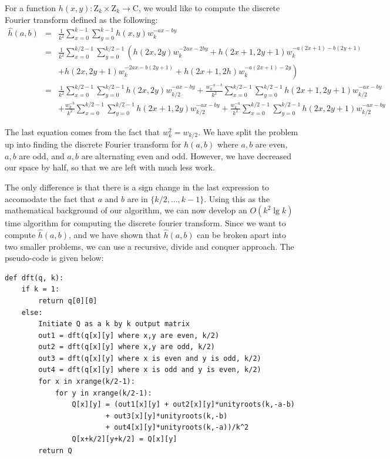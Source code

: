 \documentclass[psamsfonts]{amsart}
\newenvironment{sol}{{\bfseries Solution}}{\qedsymbol}
\theoremstyle{definition}
\theoremstyle{remark}
\numberwithin{equation}{section}
\begin{document}
\begin{sol}
For a function $h(x,y): \mathrm{Z}_{k} \times \mathrm{Z}_{k} \to \mathrm{C}$, we would like to compute the discrete Fourier transform defined as the following:
\begin{eqnarray}
\widehat{h}(a,b) &=& \frac{1}{k^2} \sum_{x=0}^{k-1} \sum_{y=0}^{k-1} h(x,y) w_k^{-ax-by} \\
&=& \frac{1}{k^2} \sum_{x=0}^{k/2 - 1} \sum_{y=0}^{k/2 - 1}  \left( h(2x, 2y) w_k^{-2ax - 2by} + h(2x + 1, 2y + 1) w_k^{-a(2x + 1) - b(2y + 1)} \right. \\
& & + \left. h(2x, 2y+1) w_k^{-2ax - b(2y+1)} + h(2x+1,2h) w_k^{-a(2x+1) - 2y} \right) \nonumber \\
&=& \frac{1}{k^2} \sum_{x=0}^{k/2 - 1} \sum_{y=0}^{k/2 - 1} h(2x, 2y) w_{k/2}^{-ax - by} +  \frac{w_{k}^{-a - b}}{k^2} \sum_{x=0}^{k/2 - 1} \sum_{y=0}^{k/2 - 1}  h(2x + 1, 2y + 1) w_{k/2}^{-ax -by}   \\
& & + \frac{w_k^{-b}}{k^2} \sum_{x=0}^{k/2-1} \sum_{y=0}^{k/2-1} h(2x+1, 2y) w_{k/2}^{-ax - by} + \frac{w_k^{-a}}{k^2} \sum_{x=0}^{k/2-1} \sum_{y=0}^{k/2 - 1} h(2x, 2y+1) w_{k/2}^{-ax-by} \nonumber
\end{eqnarray} 

The last equation comes from the fact that $w_k^2 = w_{k/2}$. We have split the problem up into finding the discrete Fourier transform for $h(a,b)$ where $a,b$ are even, $a,b$ are odd, and $a,b$ are alternating even and odd. However, we have decreased our space by half, so that we are left with much less work. 

The only difference is that there is a sign change in the last expression to accomodate the fact that $a$ and $b$ are in $\{k/2, \ldots, k-1 \}$. Using this as the mathematical background of our algorithm, we can now develop an $O(k^2 \lg k)$ time algorithm for computing the discrete fourier transform. Since we want to compute $\widehat{h}(a,b)$, and we have shown that $\widehat{h}(a,b)$ can be broken apart into two smaller problems, we can use a recursive, divide and conquer approach. The pseudo-code is given below:

\begin{verbatim}
def dft(q, k):
    if k = 1:
        return q[0][0]
    else:
        Initiate Q as a k by k output matrix 
        out1 = dft(q[x][y] where x,y are even, k/2)
        out2 = dft(q[x][y] where x,y are odd, k/2)
        out3 = dft(q[x][y] where x is even and y is odd, k/2)
        out4 = dft(q[x][y] where x is odd and y is even, k/2)
        for x in xrange(k/2-1):
            for y in xrange(k/2-1):
                Q[x][y] = (out1[x][y] + out2[x][y]*unityroots(k,-a-b)
                        + out3[x][y]*unityroots(k,-b)
                        + out4[x][y]*unityroots(k,-a))/k^2 
                Q[x+k/2][y+k/2] = Q[x][y]
        return Q
\end{verbatim}


\end{sol}
\end{document}
